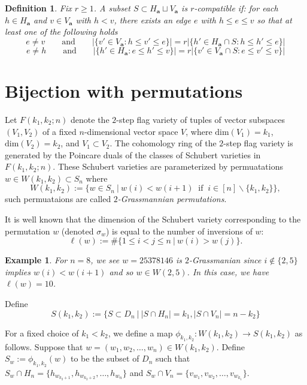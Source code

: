 \documentclass{amsart}
\newtheorem{dfn}{Definition}
\newtheorem{ex}{Example}
\newcommand{\bfa}{\mathbf{a}}
\renewcommand{\dim}{\mathrm{dim}}
\begin{document}
  \begin{dfn}
    Fix $r\ge1$.
    A subset $S\subset H_\bfa\sqcup V_\bfa$ is \emph{$r$-compatible} if: for each $h\in H_\bfa$ and $v\in V_\bfa$ with $h<v$, there exists an edge $e$ with $h\le e\le v$ so that at least one of the following holds
    \[e\ne v \qquad \text{and} \qquad \big|\{v'\in V_\bfa:h\le v'\le e\}\big|=r\big|\{h'\in H_\bfa\cap S:h\le h'\le e\}\big|\]
    \[e\ne h \qquad \text{and} \qquad \big|\{h'\in H_\bfa:e\le h'\le v\}\big|=r\big|\{v'\in V_\bfa\cap S:e\le v'\le v\}\big|\]
  \end{dfn}


  \section{Bijection with permutations}
  Let $F(k_1,k_2;n)$ denote the $2$-step flag variety of tuples of vector subspaces $(V_1,V_2)$ of a fixed $n$-dimensional vector space $V$, where $\dim(V_1)=k_1$, $\dim(V_2)=k_2$, and $V_1\subset V_2$.
  The cohomology ring of the $2$-step flag variety is generated by the Poincare duals of the classes of Schubert varieties in $F(k_1,k_2;n)$.
  These Schubert varieties are parameterized by permuatations $w\in W(k_1,k_2)\subset S_n$ where
  \[W(k_1,k_2):=\{w\in S_n \ | \ w(i)<w(i+1) \ \mbox{ if } \ i\in [n]\backslash \{k_1,k_2\}\},\]
  such permuataions are called \emph{$2$-Grassmannian permutations}.

  It is well known that the dimension of the Schubert variety corresponding to the permutation $w$ (denoted $\sigma_w$) is equal to the number of inversions of $w$: 
  \[\ell(w):=\#\{1\leq i<j\leq n \ | \ w(i)>w(j)\}.\]

  \begin{ex}
    \label{ex:2step}
    For $n=8$, we see $w=25378146$ is $2$-Grassmanian since $i\notin\{2,5\}$ implies $w(i)<w(i+1)$ and so $w\in W(2,5)$. 
    In this case, we have $\ell(w)=10$.
  \end{ex}

  Define 
  \[ S(k_1,k_2):= \{ S\subset D_n  \ | \  |S\cap H_n|=k_1, |S\cap V_n|=n-k_2\} \]

  For a fixed choice of $k_1<k_2$, we define a map $\phi_{k_1,k_2}:W(k_1,k_2)\to S(k_1,k_2)$ as follows.
  Suppose that $w =(w_1,w_2,\ldots,w_n)  \in W(k_1,k_2)$.
  Define $S_w:=\phi_{k_1,k_2} (w)$ to be the subset of $D_n$ such that $S_w \cap H_n=\{ h_{w_{k_2 +1}}, h_{w_{k_2 +2}}, \ldots, h_{w_n} \}$ and $S_w \cap V_n = \{v_{w_1},v_{w_2},\ldots,v_{w_{k_1}}\}$.
\end{document}
